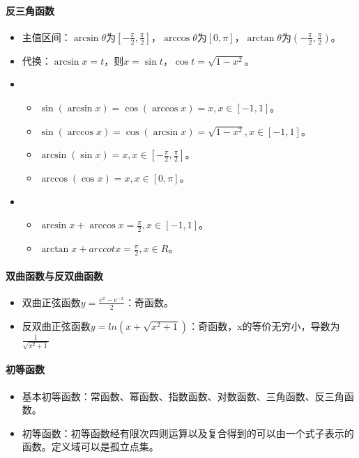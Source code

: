 \documentclass[
12pt, %
a4paper, 
oneside, %
headinclude,footinclude, %
]{scrartcl}
\begin{document}
\paragraph{反三角函数}
\begin{itemize}
\item 主值区间：$ \arcsin\theta $为$ [-\frac{\pi}{2}, \frac{\pi}{2}] $，$ \arccos\theta $为$ [0, \pi] $，$ \arctan\theta $为$ (-\frac{\pi}{2}, \frac{\pi}{2}) $。
\item 代换：$ \arcsin x = t $，则$ x = \sin t $，$ \cos t = \sqrt{1 - x^2} $。
\item 
\begin{itemize}
\item $ \sin(\arcsin x) = \cos(\arccos x) = x, x \in [-1, 1] $。
\item $ \sin(\arccos x) = \cos(\arcsin x) = \sqrt{1 - x^2}, x \in [-1, 1] $。
\item $ \arcsin(\sin x) =x, x \in [-\frac{\pi}{2}, \frac{\pi}{2}] $。
\item $ \arccos(\cos x) =x, x \in [0, \pi] $。
\end{itemize}
\item 
\begin{itemize}
\item $ \arcsin x + \arccos x = \frac{\pi}{2}, x \in [-1, 1] $。
\item $ \arctan x + arccot x = \frac{\pi}{2}, x \in R $。
\end{itemize}
\end{itemize}
\paragraph{双曲函数与反双曲函数}
\begin{itemize}
\item 双曲正弦函数$ y = \frac{e^x - e^{-x}}{2} $：奇函数。
\item 反双曲正弦函数$ y = ln(x + \sqrt{x^2 + 1}) $：奇函数，x的等价无穷小，导数为$ \frac{1}{\sqrt{x^2 + 1}} $
\end{itemize}
\paragraph{初等函数}
\begin{itemize}
\item 基本初等函数：常函数、幂函数、指数函数、对数函数、三角函数、反三角函数。
\item 初等函数：初等函数经有限次四则运算以及复合得到的可以由一个式子表示的函数。定义域可以是孤立点集。
\end{itemize}
\end{document}
